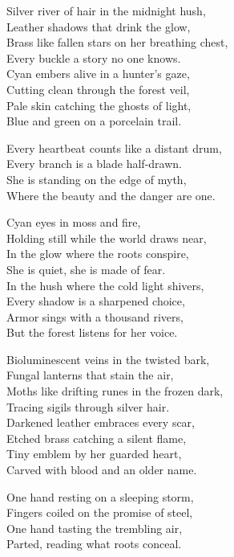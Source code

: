 \begin{lyrics}
Silver river of hair in the midnight hush,\\
Leather shadows that drink the glow,\\
Brass like fallen stars on her breathing chest,\\
Every buckle a story no one knows.\\
Cyan embers alive in a hunter’s gaze,\\
Cutting clean through the forest veil,\\
Pale skin catching the ghosts of light,\\
Blue and green on a porcelain trail.

Every heartbeat counts like a distant drum,\\
Every branch is a blade half-drawn.\\
She is standing on the edge of myth,\\
Where the beauty and the danger are one.

Cyan eyes in moss and fire,\\
Holding still while the world draws near,\\
In the glow where the roots conspire,\\
She is quiet, she is made of fear.\\
In the hush where the cold light shivers,\\
Every shadow is a sharpened choice,\\
Armor sings with a thousand rivers,\\
But the forest listens for her voice.

Bioluminescent veins in the twisted bark,\\
Fungal lanterns that stain the air,\\
Moths like drifting runes in the frozen dark,\\
Tracing sigils through silver hair.\\
Darkened leather embraces every scar,\\
Etched brass catching a silent flame,\\
Tiny emblem by her guarded heart,\\
Carved with blood and an older name.

One hand resting on a sleeping storm,\\
Fingers coiled on the promise of steel,\\
One hand tasting the trembling air,\\
Parted, reading what roots conceal.


\end{lyrics}
